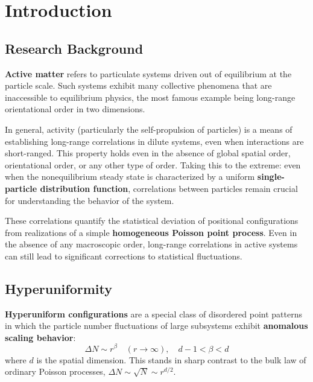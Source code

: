 
\section{Introduction}\label{sec:intro}

\subsection{Research Background}

\textbf{Active matter} refers to particulate systems driven out of equilibrium at the particle scale\cite{boltz2025}. Such systems exhibit many collective phenomena that are inaccessible to equilibrium physics, the most famous example being long-range orientational order in two dimensions\cite{vicsek1995}.

In general, activity (particularly the self-propulsion of particles) is a means of establishing long-range correlations in dilute systems, even when interactions are short-ranged. This property holds even in the absence of global spatial order, orientational order, or any other type of order. Taking this to the extreme: even when the nonequilibrium steady state is characterized by a uniform \textbf{single-particle distribution function}, correlations between particles remain crucial for understanding the behavior of the system.

\begin{notebox}
These correlations quantify the statistical deviation of positional configurations from realizations of a simple \textbf{homogeneous Poisson point process}. Even in the absence of any macroscopic order, long-range correlations in active systems can still lead to significant corrections to statistical fluctuations.
\end{notebox}

\subsection{Hyperuniformity}

\textbf{Hyperuniform configurations}\cite{torquato2018} are a special class of disordered point patterns in which the particle number fluctuations of large subsystems exhibit \textbf{anomalous scaling behavior}:
\begin{equation}\label{eq:hyperuniform-def}
\Delta N \sim r^\beta \quad (r \to \infty), \quad d-1 < \beta < d
\end{equation}
where $d$ is the spatial dimension. This stands in sharp contrast to the bulk law of ordinary Poisson processes, $\Delta N \sim \sqrt{N} \sim r^{d/2}$.

